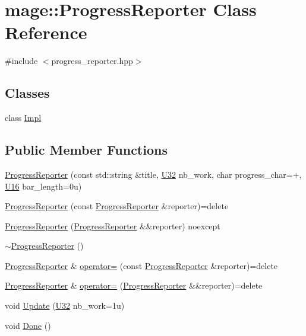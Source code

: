 \hypertarget{classmage_1_1_progress_reporter}{}\section{mage\+:\+:Progress\+Reporter Class Reference}
\label{classmage_1_1_progress_reporter}


{\ttfamily \#include $<$progress\+\_\+reporter.\+hpp$>$}

\subsection*{Classes}
\begin{DoxyCompactItemize}
\item 
class \mbox{\hyperlink{classmage_1_1_progress_reporter_1_1_impl}{Impl}}
\end{DoxyCompactItemize}
\subsection*{Public Member Functions}
\begin{DoxyCompactItemize}
\item 
\mbox{\hyperlink{classmage_1_1_progress_reporter_ab2509fb50a432812fa8ea10c77120387}{Progress\+Reporter}} (const std\+::string \&title, \mbox{\hyperlink{namespacemage_aa5d6eaabaac3cdd01873d6a3d27e90f3}{U32}} nb\+\_\+work, char progress\+\_\+char=\textquotesingle{}+\textquotesingle{}, \mbox{\hyperlink{namespacemage_a1701f09b2c3ed62768e1b7d00bf30d0b}{U16}} bar\+\_\+length=0u)
\item 
\mbox{\hyperlink{classmage_1_1_progress_reporter_a681d23ec19019c04a8a977c4f6f280ea}{Progress\+Reporter}} (const \mbox{\hyperlink{classmage_1_1_progress_reporter}{Progress\+Reporter}} \&reporter)=delete
\item 
\mbox{\hyperlink{classmage_1_1_progress_reporter_a811686b20299f63476c5a5b17c6fa443}{Progress\+Reporter}} (\mbox{\hyperlink{classmage_1_1_progress_reporter}{Progress\+Reporter}} \&\&reporter) noexcept
\item 
\mbox{\hyperlink{classmage_1_1_progress_reporter_aa543239c6dd4474a77cf4cf6904c1b26}{$\sim$\+Progress\+Reporter}} ()
\item 
\mbox{\hyperlink{classmage_1_1_progress_reporter}{Progress\+Reporter}} \& \mbox{\hyperlink{classmage_1_1_progress_reporter_aa98411a059ad0e77ca53d064176f3a86}{operator=}} (const \mbox{\hyperlink{classmage_1_1_progress_reporter}{Progress\+Reporter}} \&reporter)=delete
\item 
\mbox{\hyperlink{classmage_1_1_progress_reporter}{Progress\+Reporter}} \& \mbox{\hyperlink{classmage_1_1_progress_reporter_adfc77427eaff8caf71c1995bf986edc5}{operator=}} (\mbox{\hyperlink{classmage_1_1_progress_reporter}{Progress\+Reporter}} \&\&reporter)=delete
\item 
void \mbox{\hyperlink{classmage_1_1_progress_reporter_aee55b3ced46f7512634b0443ff9807f5}{Update}} (\mbox{\hyperlink{namespacemage_aa5d6eaabaac3cdd01873d6a3d27e90f3}{U32}} nb\+\_\+work=1u)
\item 
void \mbox{\hyperlink{classmage_1_1_progress_reporter_a11d758647ac2082bc296ab53a7454eaa}{Done}} ()
\end{DoxyCompactItemize}
